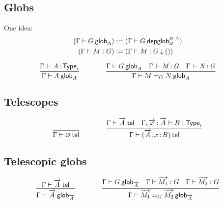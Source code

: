 
\subsection{Globs}


One idea:
\[\begin{aligned}
({\Gamma} \vdash {G} \: \mathsf{glob}_{A}) &:= ({\Gamma} \vdash {G} \: \mathsf{depglob}^{\varnothing.A}_{\varnothing}) \\
({\Gamma} \vdash {M} : {G}) &:= ({\Gamma} \vdash {M} : {G}\mathbin{\downarrow}{()})
\end{aligned}\]

\begin{small}
  \[
  \infer{\wfglob{\Gamma}{A}{A}}
  {\oftp{\Gamma}{A}{\typ{i}}}
  \qquad\qquad
  \infer{\wfglob{\Gamma}{\homj{G}{M}{N}}{A}}
  {\wfglob{\Gamma}{G}{A} &
    \oftp{\Gamma}{M}{G} &
    \oftp{\Gamma}{N}{G}
  }
  \]
\end{small}

\subsection{Telescopes}

\begin{small}
  \[
  \infer{\wftel{\Gamma}{\varnothing}}{}
  \qquad\qquad
  \infer
    {\wftel{\Gamma}{(\tel A,\tptm{x}{B})}}
    {\wftel{\Gamma}{\tel A}
    & \wftype{\Gamma,\teltm xA}{B}}
  \]
\end{small}

\subsection{Telescopic globs}

\begin{small}
  \[
  \infer
    {\wfglob{\Gamma}{\tel A}{\tel A}}
    {\wftel{\Gamma}{\tel A}}
  \qquad\qquad
  \infer
    {\wfglob{\Gamma}{\homj{G}{\tel{M_1}}{\tel{M_2}}}{\tel A}}
    {\wfglob{\Gamma}{G}{\tel A}
    & \ofglob{\Gamma}{\tel{M_1}}{G}
    & \ofglob{\Gamma}{\tel{M_2}}{G}}
  \]
\end{small}

